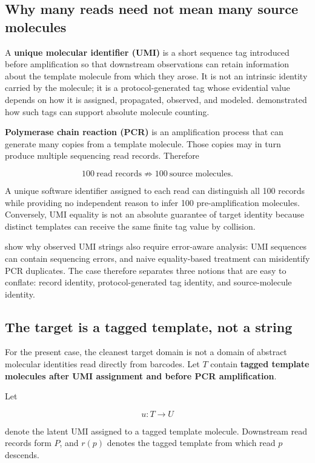 \documentclass[11pt]{article}
\begin{document}
\subsection{Why many reads need not mean many source molecules}

A \textbf{unique molecular identifier (UMI)} is a short sequence tag introduced before amplification so that downstream observations can retain information about the template molecule from which they arose. It is not an intrinsic identity carried by the molecule; it is a protocol-generated tag whose evidential value depends on how it is assigned, propagated, observed, and modeled. \citet{Kivioja2012UMI} demonstrated how such tags can support absolute molecule counting.

\textbf{Polymerase chain reaction (PCR)} is an amplification process that can generate many copies from a template molecule. Those copies may in turn produce multiple sequencing read records. Therefore

\[
100\ \text{read records}
\not\Rightarrow
100\ \text{source molecules}.
\]

A unique software identifier assigned to each read can distinguish all 100 records while providing no independent reason to infer 100 pre-amplification molecules. Conversely, UMI equality is not an absolute guarantee of target identity because distinct templates can receive the same finite tag value by collision.

\citet{SmithHegerSudbery2017UMITools} show why observed UMI strings also require error-aware analysis: UMI sequences can contain sequencing errors, and naive equality-based treatment can misidentify PCR duplicates. The case therefore separates three notions that are easy to conflate: record identity, protocol-generated tag identity, and source-molecule identity.

\subsection{The target is a tagged template, not a string}

For the present case, the cleanest target domain is not a domain of abstract molecular identities read directly from barcodes. Let \(T\) contain \textbf{tagged template molecules after UMI assignment and before PCR amplification}.

Let

\[
u:T\to U
\]

denote the latent UMI assigned to a tagged template molecule. Downstream read records form \(P\), and \(r(p)\) denotes the tagged template from which read \(p\) descends.
\end{document}
